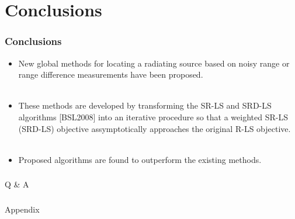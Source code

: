 \section{Conclusions}

\begin{frame}
\frametitle{Conclusions}
\phantom{m}
\phantom{m}
\begin{itemize}
\item <2->
New global methods for locating a radiating source based on noisy range or range difference measurements have been proposed. \\~\\
\item <3->
These methods are developed by transforming the SR-LS and SRD-LS algorithms [BSL2008] into an iterative procedure %
so that a weighted SR-LS (SRD-LS) objective assymptotically approaches the original R-LS objective. \\~\\
\item <4->
Proposed algorithms are found to outperform the existing methods.
\end{itemize}
\end{frame}


\begin{frame} [noframenumbering]
\frametitle{  }
\phantom{m} 
\phantom{m}
\phantom{m} 
\phantom{m}
\phantom{m} 
\phantom{m}
\Huge{\centerline{Q \& A }}

\end{frame}

%
\appendix
\begin{frame} [noframenumbering]
\frametitle{  }
\phantom{m} 
\phantom{m}
\phantom{m} 
\phantom{m}
\phantom{m} 
\phantom{m}
\Huge{\centerline{Appendix}}
\end{frame}

